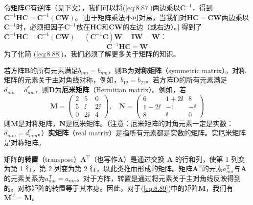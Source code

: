     令矩阵$\mathbf{C}$有逆阵（见下文），我们可以将(\ref{eq:8.87})两边乘以$\mathbf{C}^{-1}$，得到$\mathbf{C}^{-1}\mathbf{HC} = \mathbf{C}^{-1}\left(\mathbf{CW}\right)$。[由于矩阵乘法不可对易，当我们对$\mathbf{HC} = \mathbf{CW}$两边乘以$\mathbf{C}^{-1}$时，必须把因子$\mathbf{C}^{-1}$放在$\mathbf{HC}$和$\mathbf{CW}$的左边（或右边）。] 得到了$\mathbf{C}^{-1}\mathbf{HC} = \mathbf{C}^{-1}\left(\mathbf{CW}\right) = \left(\mathbf{C}^{-1}\mathbf{C}\right)\mathbf{W} = \mathbf{I}\mathbf{W} = \mathbf{W}$：
    \begin{equation}
        \mathbf{C}^{-1}\mathbf{HC} = \mathbf{W}
        \label{eq:8.88}
    \end{equation}
    为了化简 (\ref{eq:8.88})，我们必须了解更多关于矩阵的知识。

    若方阵$\mathbf{B}$的所有元素满足$b_{mn} = b_{nm}$，则$\mathbf{B}$为\textbf{对称矩阵}（symmetric matrix）。对称矩阵的元素关于主对角线对称，例如，$b_{12} = b_{21}$。若方阵$\mathbf{D}$的所有元素满足$d_{mn} = d_{nm}^{\ast}$，则$\mathbf{D}$为\textbf{厄米矩阵}（Hermitian matrix）。例如，若
    \begin{equation}
        \mathbf{M} = \begin{pmatrix}
            2 & 5 & 0 \\
            5 & \ii & 2\ii \\
            0 & 2\ii & 4
        \end{pmatrix}, \quad \mathbf{N} = \begin{pmatrix}
            6 & 1 + 2\ii & 8 \\
            1 - 2\ii & -1 & -\ii \\
            8 & \ii & 0
        \end{pmatrix}
        \label{eq:8.89}
    \end{equation}
    则$\mathbf{M}$是对称矩阵，$\mathbf{N}$是厄米矩阵。（注意：厄米矩阵的对角元素一定是实数：$d_{mm} = d_{mm}^{\ast}$。）\textbf{实矩阵}（real matrix）是指所有元素都是实数的矩阵。实厄米矩阵是对称矩阵。

    矩阵的\textbf{转置}（transpose）$\mathbf{A}^{\mathrm{T}}$（也写作$\tilde{\mathbf{A}}$）是通过交换 $\mathbf{A}$ 的行和列，使第 1 列变为第 1 行，第 2 列变为第 2 行，以此类推而形成的矩阵。矩阵$\mathbf{A}^{\mathrm{T}}$的元素$a_{mn}^{\mathrm{T}}$与$\mathbf{A}$的元素关系为$a_{mn}^{\mathrm{T}} = a_{nm}$。对于方阵，转置是通过将元素关于主对角线反映得到的。对称矩阵的转置等于其本身。因此，对于(\ref{eq:8.89})中的矩阵$\mathbf{M}$，我们有$\mathbf{M}^{\mathrm{T}} = \mathbf{M}$。

